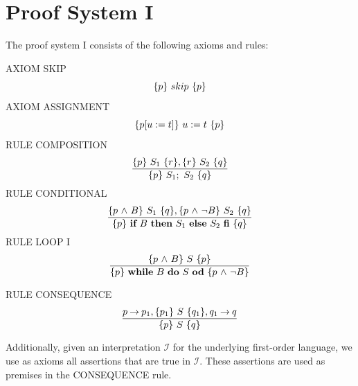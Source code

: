 \documentclass[runningheads]{llncs}       %
\begin{document}







\appendix

\section{Proof System I}
\label{sec:I}

The proof system I consists of the following axioms and rules:
\VV

\NI
AXIOM \label{rul:skip} SKIP
\[ \mbox{$\{{p}\}\ {skip}\ \{{p}\}$} \]
%
\NI
AXIOM \label{rul:assi} ASSIGNMENT
\[ \mbox{$\{{p[u:=t]}\}\ {u:=t}\ \{{p}\}$} \]
%
\NI
RULE \label{rul:comp} COMPOSITION
\[ \frac{ \mbox{$\{{p}\}\ {S_1}\ \{{r}\}$}, \mbox{$\{{r}\}\ {S_2}\ \{{q}\}$}                }
        { \mbox{$\{{p}\}\ {S_1;\ S_2}\ \{{q}\}$}                          }\]
%
\NI
RULE \label{rul:cond} CONDITIONAL
\[ \frac{ \mbox{$\{{p \mbox{$\ \wedge\ $} B}\}\ {S_1}\ \{{q}\}$}, \mbox{$\{{p \mbox{$\ \wedge\ $} \neg B}\}\ {S_2}\ \{{q}\}$}         }
        { \mbox{$\{{p}\}\ {\mbox{$\mbox{{\bf if}\ } {B} \mbox{\ {\bf then}\ } {S_1} \mbox{\ {\bf else}\ } {S_2}\ \mbox{{\bf fi}}$}}\ \{{q}\}$}                          }\]
%
\NI
RULE \label{rul:loop} LOOP I
\[ \frac{ \mbox{$\{{p \mbox{$\ \wedge\ $} B}\}\ {S}\ \{{p}\}$}                             }
        { \mbox{$\{{p}\}\ {\mbox{$\mbox{{\bf while}\ } {B}\ \mbox{{\bf do}\ } {S}\ \mbox{{\bf od}}$}}\ \{{p \mbox{$\ \wedge\ $} \neg B}\}$}               }\]
%

\NI
RULE \label{rul:cons} CONSEQUENCE
\[ \frac{ p \mbox{$\:\rightarrow\:$} p_1, \mbox{$\{{p_1}\}\ {S}\ \{{q_1}\}$}, q_1 \mbox{$\:\rightarrow\:$} q        }
        { \mbox{$\{{p}\}\ {S}\ \{{q}\}$}                                  }\]
%

Additionally, given an interpretation $\mathcal{I}$ for the underlying first-order language, 
we use as axioms all assertions that are true in $\mathcal{I}$. 
These assertions are used as premises in the CONSEQUENCE rule. 








\end{document}
